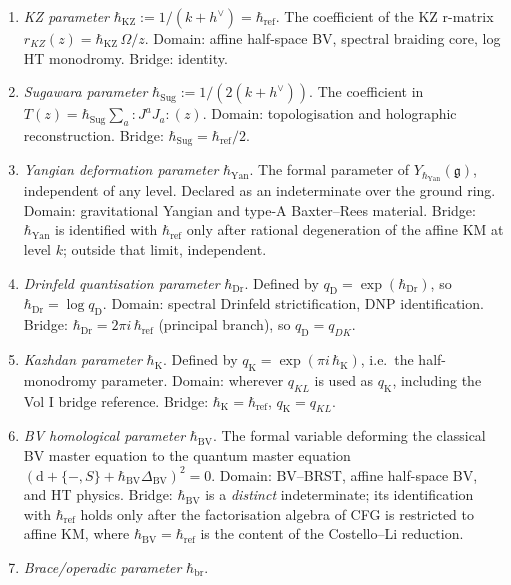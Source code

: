 \begin{enumerate}
\item[(1)] \emph{KZ parameter} $\hbar_{\mathrm{KZ}} := 1/(k+h^\vee) = \hbar_{\mathrm{ref}}$.
 The coefficient of the KZ r-matrix $r_{KZ}(z) = \hbar_{\mathrm{KZ}}\,\Omega/z$.
 Domain: affine half-space BV, spectral braiding core, log HT monodromy.
 Bridge: identity.
\item[(2)] \emph{Sugawara parameter} $\hbar_{\mathrm{Sug}} := 1/(2(k+h^\vee))$.
 The coefficient in $T(z) = \hbar_{\mathrm{Sug}} \sum_a {:}J^a J_a{:}(z)$.
 Domain: topologisation and holographic reconstruction.
 Bridge: $\hbar_{\mathrm{Sug}} = \hbar_{\mathrm{ref}}/2$.
\item[(3)] \emph{Yangian deformation parameter} $\hbar_{\mathrm{Yan}}$.
 The formal parameter of $Y_{\hbar_{\mathrm{Yan}}}(\mathfrak{g})$, independent
 of any level. Declared as an indeterminate over the ground ring.
 Domain: gravitational Yangian and type-A Baxter--Rees material.
 Bridge: $\hbar_{\mathrm{Yan}}$ is identified with $\hbar_{\mathrm{ref}}$ only
 after rational degeneration of the affine KM at level $k$; outside that
 limit, independent.
\item[(4)] \emph{Drinfeld quantisation parameter} $\hbar_{\mathrm{Dr}}$.
 Defined by $q_{\mathrm{D}} = \exp(\hbar_{\mathrm{Dr}})$, so
 $\hbar_{\mathrm{Dr}} = \log q_{\mathrm{D}}$.
 Domain: spectral Drinfeld strictification, DNP identification.
 Bridge: $\hbar_{\mathrm{Dr}} = 2\pi i\,\hbar_{\mathrm{ref}}$ (principal branch),
 so $q_{\mathrm{D}} = q_{DK}$.
\item[(5)] \emph{Kazhdan parameter} $\hbar_{\mathrm{K}}$.
 Defined by $q_{\mathrm{K}} = \exp(\pi i\,\hbar_{\mathrm{K}})$, i.e.\ the
 half-monodromy parameter.
 Domain: wherever $q_{KL}$ is used as $q_{\mathrm{K}}$, including the Vol I
 bridge reference.
 Bridge: $\hbar_{\mathrm{K}} = \hbar_{\mathrm{ref}}$, $q_{\mathrm{K}} = q_{KL}$.
\item[(6)] \emph{BV homological parameter} $\hbar_{\mathrm{BV}}$.
 The formal variable deforming the classical BV master equation to the
 quantum master equation $(\mathrm{d}+\{-,S\}+\hbar_{\mathrm{BV}}\Delta_{\mathrm{BV}})^{2}=0$.
 Domain: BV--BRST, affine half-space BV, and HT physics.
 Bridge: $\hbar_{\mathrm{BV}}$ is a \emph{distinct} indeterminate; its
 identification with $\hbar_{\mathrm{ref}}$ holds only after the factorisation
 algebra of CFG is restricted to affine KM, where
 $\hbar_{\mathrm{BV}} = \hbar_{\mathrm{ref}}$ is the content of the
 Costello--Li reduction.
\item[(7)] \emph{Brace/operadic parameter} $\hbar_{\mathrm{br}}$.

\end{enumerate}
